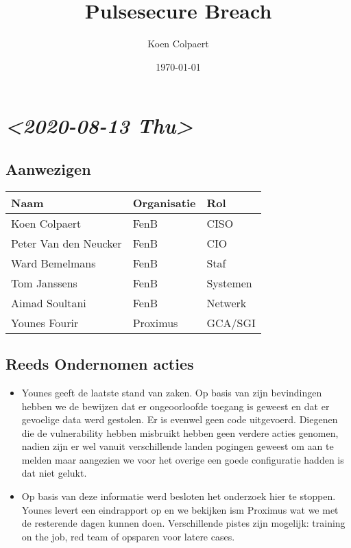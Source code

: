\documentclass[11pt]{article}
\author{Koen Colpaert}
\date{\today}
\title{Pulsesecure Breach}
\begin{document}
\maketitle

\section{\textit{<2020-08-13 Thu>}}
\label{sec:orgd638dc9}

\subsection{Aanwezigen}
\label{sec:org9f75fbc}

\begin{center}
\begin{tabular}{lll}
Naam & Organisatie & Rol\\
\hline
Koen Colpaert & FenB & CISO\\
Peter Van den Neucker & FenB & CIO\\
Ward Bemelmans & FenB & Staf\\
Tom Janssens & FenB & Systemen\\
Aimad Soultani & FenB & Netwerk\\
Younes Fourir & Proximus & GCA/SGI\\
\end{tabular}
\end{center}

\subsection{Reeds Ondernomen acties}
\label{sec:org97dc4ad}
\begin{itemize}
\item Younes geeft de laatste stand van zaken. Op basis van zijn bevindingen hebben we de bewijzen dat er ongeoorloofde toegang is geweest en dat er gevoelige data werd gestolen. Er is evenwel geen code uitgevoerd. Diegenen die de vulnerability hebben misbruikt hebben geen verdere acties genomen, nadien zijn er wel vanuit verschillende landen pogingen geweest om aan te melden maar aangezien we voor het overige een goede configuratie hadden is dat niet gelukt.
\item Op basis van deze informatie werd besloten het onderzoek hier te stoppen. Younes levert een eindrapport op en we bekijken ism Proximus wat we met de resterende dagen kunnen doen. Verschillende pistes zijn mogelijk: training on the job, red team of opsparen voor latere cases.
\end{itemize}
\end{document}
